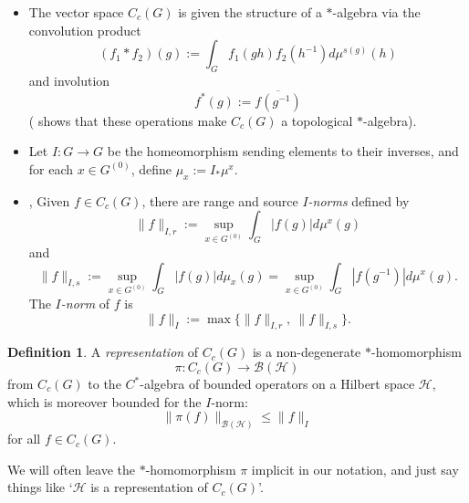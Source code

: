 \documentclass{article}
\newcommand{\h}{\mathcal{H}}
\theoremstyle{plain}
\theoremstyle{definition}
\newtheorem{definition}[theorem]{Definition}
\theoremstyle{remark}
\newtheorem{remark}[theorem]{Remark}
\begin{document}
\begin{itemize}
\item The vector space $C_c(G)$ is given the structure of a $*$-algebra via the convolution product
$$
(f_1*f_2)(g):=\int_G f_1(gh)f_2(h^{-1})d\mu^{s(g)}(h)
$$
and involution
$$
f^*(g):=\overline{f(g^{-1})}
$$
(\cite[Proposition II.1.1]{Renault:1980fk} shows that these operations make $C_c(G)$ a topological $*$-algebra).
\item  \cite[page 22]{Renault:1980fk} Let $I:G\to G$ be the homeomorphism sending elements to their inverses, and for each $x\in G^{(0)}$, define $\mu_x:=I_*\mu^x$.
\item \cite[page 141]{Anantharaman-Delaroche:2000mw}, \cite[page 50]{Renault:1980fk} Given $f\in C_c(G)$, there are range and source \emph{$I$-norms} defined by
$$
\|f\|_{I,r}:=\sup_{x\in G^{(0)}}\int_G|f(g)|d\mu^x(g)
$$
and 
$$
\|f\|_{I,s}:=\sup_{x\in G^{(0)}}\int_G|f(g)|d\mu_x(g)=\sup_{x\in G^{(0)}}\int_G|f(g^{-1})|d\mu^x(g).
$$
The \emph{$I$-norm} of $f$ is 
$$
\|f\|_I:=\max\{\|f\|_{I,r},~\|f\|_{I,s}\}.
$$
\end{itemize}

\begin{definition}\label{rep}
A \emph{representation} of $C_c(G)$ is a non-degenerate $*$-homomorphism
$$
\pi:C_c(G)\to \mathcal{B}(\h)
$$
from $C_c(G)$ to the $C^*$-algebra of bounded operators on a Hilbert space $\h$, which is moreover bounded for the $I$-norm:
$$
\|\pi(f)\|_{\mathcal{B}(\h)}\leq \|f\|_I
$$
for all $f\in C_c(G)$.
\end{definition}

We will often leave the $*$-homomorphism $\pi$ implicit in our notation, and just say things like `$\h$ is a representation of $C_c(G)$'.

\begin{comment}
\begin{remark}\label{group}
If $G$ is a locally compact \emph{unimodular} group (equipped with a fixed Haar measure), then $C_c(G)$ as above is the same as the usual group convolution algebra, and boundedness for the $I$-norm is the same as boundedness for the usual $L^1$ norm.  If not, one easily checks that the vector space isomorphism defined by
$$
\phi:C_c(G)\to C_c(G),~~~\phi(f)(g)=(f(g)\Delta(g))^{-1/2}
$$
intertwines the $*$-algebra structure above and the more usual $*$-algebra structure for a group that has the same convolution as above, but involution defined by 
$$
f^*(g):=\overline{f(g^{-1})}\Delta(g^{-1}).
$$
Using this, one sees using standard arguments that $I$-bounded non-degenerate $*$-representations of $C_c(G)$ (with our $*$-algebra structure) are in one-to-one correspondence with unitary representations of $G$.
\end{remark}
\end{comment}
\end{document}

